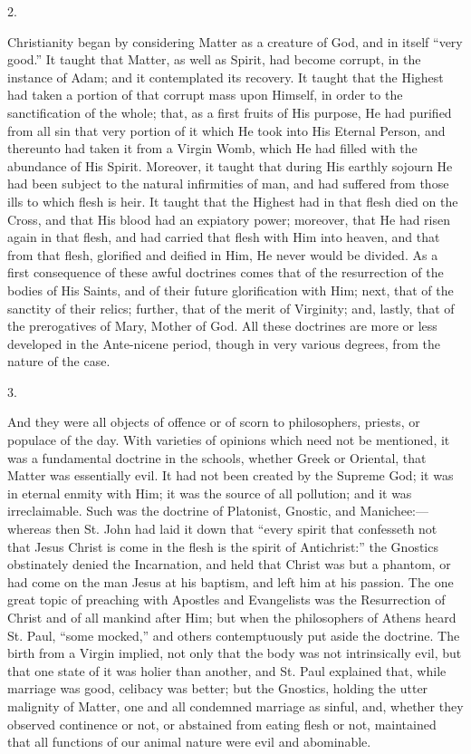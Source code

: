 2.

Christianity began by considering Matter as a creature of God, and
in itself ``very good.'' It taught that Matter, as well as
Spirit, had become corrupt, in the instance of Adam; and it
contemplated its recovery. It taught that the Highest had taken a
portion of that corrupt mass upon Himself, in order to the
sanctification of the whole; that, as a first fruits of His purpose,
He had purified from all sin that very portion of it which He took
into His Eternal Person, and thereunto had taken it from a Virgin
Womb, which He had filled with the abundance of His Spirit. Moreover,
it taught that during His earthly sojourn He had been subject to the
natural infirmities of man, and had suffered from those ills to which
flesh is heir. It taught that the Highest had in that flesh died on
the Cross, and that His blood had an expiatory power; moreover, that
He had risen again in that flesh, and had carried that flesh with Him
into heaven, and that from that flesh, glorified and deified in Him,
He never would be divided. As a first consequence of these awful
doctrines comes that of the resurrection of the bodies of His Saints,
and of their future glorification with Him; next, that of the sanctity
of their relics; further, that of the merit of Virginity; and, lastly,
that of the prerogatives of Mary, Mother of God. All these doctrines
are more or less developed in the Ante-nicene period, though in very
various degrees, from the nature of the case.

3.

And they were all objects of offence or of scorn to philosophers,
priests, or populace of the day. With varieties of opinions which need
not be mentioned, it was a fundamental doctrine in the schools,
whether Greek or Oriental, that Matter was essentially evil. It had
not been created by the Supreme God; it was in eternal enmity with
Him; it was the source of all pollution; and it was irreclaimable.
Such was the doctrine of Platonist, Gnostic, and Manichee:—whereas
then St. John had laid it down that ``every spirit that confesseth
not that Jesus Christ is come in the flesh is the spirit of
Antichrist:'' the Gnostics obstinately denied the Incarnation, and
held that Christ was but a phantom, or had come on the man Jesus at
his baptism, and left him at his passion. The one great topic of
preaching with Apostles and Evangelists was the Resurrection of Christ
and of all mankind after Him; but when the philosophers of Athens
heard St. Paul, ``some mocked,'' and others contemptuously put
aside the doctrine. The birth from a Virgin implied, not only that the
body was not intrinsically evil, but that one state of it was holier
than another, and St. Paul explained that, while marriage was good,
celibacy was better; but the Gnostics, holding the utter malignity of
Matter, one and all condemned marriage as sinful, and, whether they
observed continence or not, or abstained from eating flesh or not,
maintained that all functions of our animal nature were evil and
abominable.

